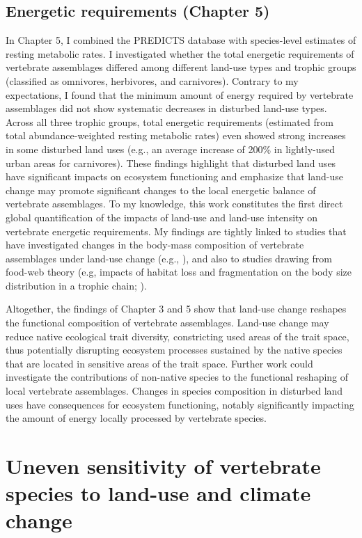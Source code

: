 \subsection{Energetic requirements (Chapter 5)}
In Chapter 5, I combined the PREDICTS database with species-level estimates of resting metabolic rates. I investigated whether the total energetic requirements of vertebrate assemblages differed among different land-use types and trophic groups (classified as omnivores, herbivores, and carnivores). Contrary to my expectations, I found that the minimum amount of energy required by vertebrate assemblages did not show systematic decreases in disturbed land-use types. Across all three trophic groups, total energetic requirements (estimated from total abundance-weighted resting metabolic rates) even showed strong increases in some disturbed land uses (e.g., an average increase of 200\% in lightly-used urban areas for carnivores). These findings highlight that disturbed land uses have significant impacts on ecosystem functioning and emphasize that land-use change may promote significant changes to the local energetic balance of vertebrate assemblages. To my knowledge, this work constitutes the first direct global quantification of the impacts of land-use and land-use intensity on vertebrate energetic requirements. My findings are tightly linked to studies that have investigated changes in the body-mass composition of vertebrate assemblages under land-use change (e.g., \citet{Newbold2020}), and also to studies drawing from food-web theory (e.g, impacts of habitat loss and fragmentation on the body size distribution in a trophic chain; \citet{Hillaert2020}). 

\vspace{0.5cm}
Altogether, the findings of Chapter 3 and 5 show that land-use change reshapes the functional composition of vertebrate assemblages. Land-use change may reduce native ecological trait diversity, constricting used areas of the trait space, thus potentially disrupting ecosystem processes sustained by the native species that are located in sensitive areas of the trait space. Further work could investigate the contributions of non-native species to the functional reshaping of local vertebrate assemblages. Changes in species composition in disturbed land uses have consequences for ecosystem functioning, notably significantly impacting the amount of energy locally processed by vertebrate species.


\section{Uneven sensitivity of vertebrate species to land-use and climate change}

